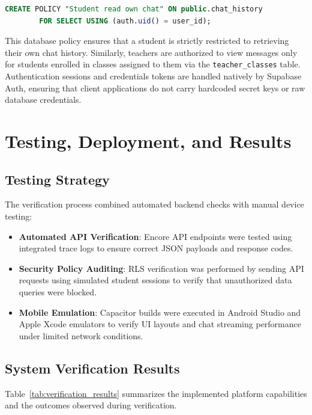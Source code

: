 \documentclass[12pt,a4paper,oneside]{report}
\begin{document}
    \begin{lstlisting}[language=SQL,caption={Row-Level Security policy for chat history}]
    CREATE POLICY "Student read own chat" ON public.chat_history
        FOR SELECT USING (auth.uid() = user_id);
    \end{lstlisting}

    This database policy ensures that a student is strictly restricted to retrieving their own chat history. Similarly, teachers are authorized to view messages only for students enrolled in classes assigned to them via the \texttt{teacher\_classes} table. Authentication sessions and credentials tokens are handled natively by Supabase Auth, ensuring that client applications do not carry hardcoded secret keys or raw database credentials.

    \chapter{Testing, Deployment, and Results}
    \label{ch:test}

    \section{Testing Strategy}
    The verification process combined automated backend checks with manual device testing:
    \begin{itemize}
        \item \textbf{Automated API Verification}: Encore API endpoints were tested using integrated trace logs to ensure correct JSON payloads and response codes.
        \item \textbf{Security Policy Auditing}: RLS verification was performed by sending API requests using simulated student sessions to verify that unauthorized data queries were blocked.
        \item \textbf{Mobile Emulation}: Capacitor builds were executed in Android Studio and Apple Xcode emulators to verify UI layouts and chat streaming performance under limited network conditions.
    \end{itemize}

    \section{System Verification Results}
    Table~\ref{tab:verification_results} summarizes the implemented platform capabilities and the outcomes observed during verification.
\end{document}
